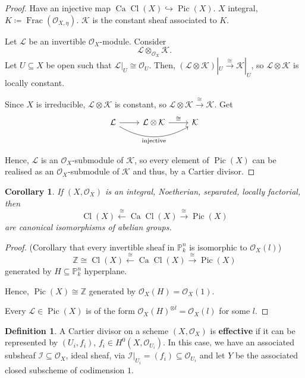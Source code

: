\documentclass[12pt]{article}
\DeclareMathOperator{\Frac}{Frac}
\DeclareMathOperator{\Pic}{Pic}
\DeclareMathOperator{\Cl}{Cl}
\DeclareMathOperator{\Ca}{Ca}
\newtheorem*{corollary}{Corollary}
\theoremstyle{definition}
\newtheorem*{definition}{Definition}
\begin{document}
\begin{proof}
Have an injective map $\Ca\Cl(X)\hookrightarrow\Pic(X)$. $X$ integral, $K\coloneqq\Frac(\mathcal O_{X,\eta})$. $\mathcal K$ is the constant sheaf associated to $K$.

Let $\mathcal L$ be an invertible $\mathcal O_X$-module. Consider
\[\mathcal L\otimes_{\mathcal O_X}\mathcal K.\]
Let $U\subseteq X$ be open such that $\mathcal L|_U\cong\mathcal O_U$. Then, $(\mathcal L\otimes\mathcal K)|_U\overset\cong\longrightarrow\mathcal K|_U$, so $\mathcal L\otimes\mathcal K$ is locally constant.

Since $X$ is irreducible, $\mathcal L\otimes\mathcal K$ is constant, so $\mathcal L\otimes\mathcal K\xrightarrow\cong\mathcal K$. Get
\[\begin{tikzcd}\mathcal L\arrow[r]\arrow[rr,bend right,"\text{injective}",swap]&\mathcal L\otimes\mathcal K\arrow[r,"\cong"]&\mathcal K\end{tikzcd}\]

Hence, $\mathcal L$ is an $\mathcal O_X$-submodule of $\mathcal K$, so every element of $\Pic(X)$ can be realised as an $\mathcal O_X$-submodule of $\mathcal K$ and thus, by a Cartier divisor.
\end{proof}

\begin{corollary}
If $(X,\mathcal O_X)$ is an integral, Noetherian, separated, locally factorial, then
\[\Cl(X)\overset\cong\longleftarrow\Ca\Cl(X)\overset\cong\longrightarrow\Pic(X)\]
are canonical isomorphisms of abelian groups.
\end{corollary}

\begin{proof}
(Corollary that every invertible sheaf in $\mathbb P_k^n$ is isomorphic to $\mathcal O_X(l)$)
\[\mathbb Z\cong\Cl(X)\overset\cong\longleftarrow\Ca\Cl(X)\overset\cong\longrightarrow\Pic(X)\]
generated by $H\subseteq\mathbb P_k^n$ hyperplane.

Hence, $\Pic(X)\cong\mathbb Z$ generated by $\mathcal O_X(H)=\mathcal O_X(1)$.

Every $\mathcal L\in\Pic(X)$ is of the form $\mathcal O_X(H)^{\otimes l}=\mathcal O_X(l)$ for some $l$.
\end{proof}

\begin{definition}
A Cartier divisor on a scheme $(X,\mathcal O_X)$ is \textbf{effective} if it can be represented by $(U_i,f_i)$, $f_i\in H^0(X,\mathcal O_{U_i})$. In this case, we have an associated subsheaf $\mathcal I\subseteq\mathcal O_X$, ideal sheaf, via $\mathcal I|_{U_i}=(f_i)\subseteq\mathcal O_{U_i}$ and let $Y$ be the associated closed subscheme of codimension $1$.
\end{definition}
\end{document}
